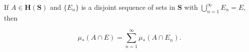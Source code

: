If $A \in \mathbf{H}(\mathbf{S})$ and $\{E_n\}$ is a disjoint sequence of sets in $\mathbf{S}$ with $\bigcup_{n=1}^{\infty} E_n = E$, then

$$\mu_*(A \cap E) = \sum_{n=1}^{\infty} \mu_*(A \cap E_n).$$
